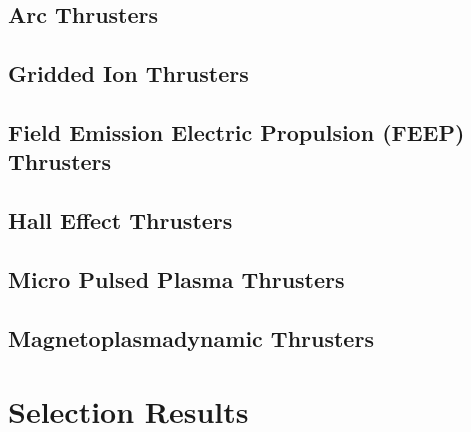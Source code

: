 \subsection{Arc Thrusters}

\subsection{Gridded Ion Thrusters}

\subsection{Field Emission Electric Propulsion (FEEP) Thrusters}

\subsection{Hall Effect Thrusters}

\subsection{Micro Pulsed Plasma Thrusters}

\subsection{Magnetoplasmadynamic Thrusters}

\section{Selection Results}

